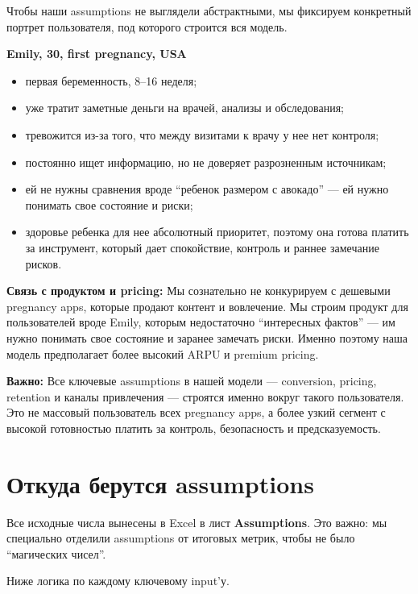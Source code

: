\documentclass[10pt,a4paper]{article}
\begin{document}
Чтобы наши assumptions не выглядели абстрактными, мы фиксируем конкретный портрет пользователя, под которого строится вся модель.

\begin{softbox}
\textbf{Emily, 30, first pregnancy, USA}

\begin{itemize}
    \item первая беременность, 8--16 неделя;
    \item уже тратит заметные деньги на врачей, анализы и обследования;
    \item тревожится из-за того, что между визитами к врачу у нее нет контроля;
    \item постоянно ищет информацию, но не доверяет разрозненным источникам;
    \item ей не нужны сравнения вроде ``ребенок размером с авокадо'' --- ей нужно понимать свое состояние и риски;
    \item здоровье ребенка для нее абсолютный приоритет, поэтому она готова платить за инструмент, который дает спокойствие, контроль и раннее замечание рисков.
\end{itemize}
\end{softbox}

\textbf{Связь с продуктом и pricing:}  
Мы сознательно не конкурируем с дешевыми pregnancy apps, которые продают контент и вовлечение. Мы строим продукт для пользователей вроде Emily, которым недостаточно ``интересных фактов'' --- им нужно понимать свое состояние и заранее замечать риски. Именно поэтому наша модель предполагает более высокий ARPU и premium pricing.

\textbf{Важно:}  
Все ключевые assumptions в нашей модели --- conversion, pricing, retention и каналы привлечения --- строятся именно вокруг такого пользователя. Это не массовый пользователь всех pregnancy apps, а более узкий сегмент с высокой готовностью платить за контроль, безопасность и предсказуемость.

\section{Откуда берутся assumptions}

Все исходные числа вынесены в Excel в лист \textbf{Assumptions}. Это важно: мы специально отделили assumptions от итоговых метрик, чтобы не было ``магических чисел''.

Ниже логика по каждому ключевому input'у.
\end{document}
